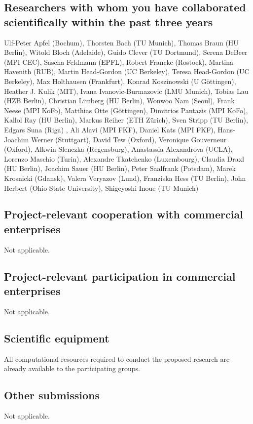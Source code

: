 \documentclass[a4paper,11pt,headings=normal]{scrartcl}
\begin{document}
\begin{itemize}
\subsection{Researchers with whom you have collaborated scientifically 
	within the past three years}
Ulf-Peter Apfel (Bochum), Thorsten Bach (TU Munich), Thomas Braun (HU Berlin), Witold Bloch (Adelaide), Guido Clever (TU Dortmund),
Serena DeBeer (MPI CEC), Sascha Feldmann (EPFL), Robert Francke (Rostock), Martina Havenith (RUB), Martin Head-Gordon (UC Berkeley), Teresa Head-Gordon (UC Berkeley), Max Holthausen (Frankfurt), Konrad Koszinowski (U Göttingen), Heather J. Kulik (MIT), Ivana Ivanovic-Burmazovic (LMU Munich),
Tobias Lau (HZB Berlin), Christian Limberg (HU Berlin), Wonwoo Nam (Seoul), 
Frank Neese (MPI KoFo), Matthias Otte (G\"ottingen), Dimitrios Pantazis (MPI 
KoFo), Kallol Ray (HU Berlin), Markus Reiher (ETH Zürich), Sven Stripp (TU Berlin), Edgars Suna (Riga)
, Ali Alavi (MPI FKF), Daniel Kats (MPI FKF), Hans-Joachim Werner (Stuttgart), David Tew (Oxford), Veronique Gouverneur (Oxford), Alkwin Slenczka (Regensburg), Anastassia Alexandrova (UCLA), Lorenzo Maschio (Turin), Alexandre Tkatchenko (Luxembourg), Claudia Draxl (HU Berlin), Joachim Sauer (HU Berlin), Peter Saalfrank (Potsdam), Marek Krosnicki (Gdansk), Valera Veryazov (Lund), Franziska Hess (TU Berlin), John Herbert (Ohio State University), Shigeyoshi Inoue (TU Munich)

\ifoot{}
\ofoot{}

\subsection{Project-relevant cooperation with commercial enterprises}
Not applicable. 

\subsection{Project-relevant participation in commercial enterprises}
Not applicable. 

\subsection{Scientific equipment}
All computational resources required to conduct the proposed research are 
already available to the participating groups. 

\subsection{Other submissions}
Not applicable. 


\end{itemize}
\end{document}
